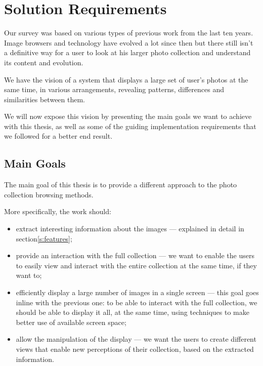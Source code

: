 \chapter{Solution Requirements} %
\label{chapter:solution_requirements}

Our survey was based on various types of previous work from the last ten years. Image browsers and technology have evolved a lot since then but there still isn't a definitive way for a user to look at his larger photo collection and understand its content and evolution.



We have the vision of a system that displays a large set of user’s photos at the same time, in various arrangements, revealing patterns, differences and similarities between them.

We will now expose this vision by presenting the main goals we want to achieve with this thesis, as well as some of the guiding implementation requirements that we followed for a better end result.





\section{Main Goals} %
\label{s:main_goal}

The main goal of this thesis is to provide a different approach to the photo collection browsing methods.

More specifically, the work should:

\begin{itemize}
	\item{extract interesting information about the images — explained in detail in section\ref{s:features};}


	\item{provide an interaction with the full collection — we want to enable the users to easily view and interact with the entire collection at the same time, if they want to;}

	\item{efficiently display a large number of images in a single screen — this goal goes inline with the previous one: to be able to interact with the full collection, we should be able to display it all, at the same time, using techniques to make better use of available screen space;}

	\item{allow the manipulation of the display — we want the users to create different views that enable new perceptions of their collection, based on the extracted information.}

\end{itemize}

